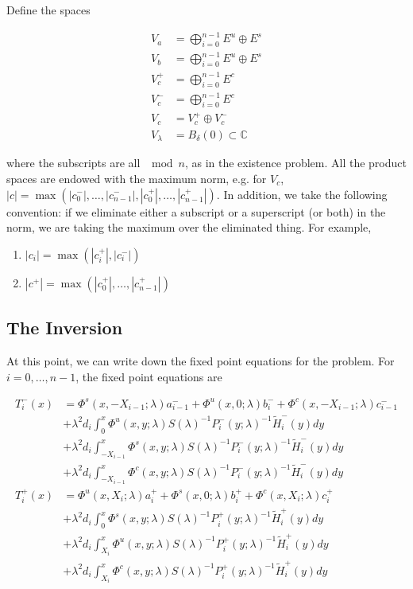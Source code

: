 \documentclass[12pt]{article}
\def\C{{\mathbb C}}
\begin{document}
Define the spaces

\begin{align*}
V_a &= \bigoplus_{i=0}^{n-1} E^u \oplus E^s \\
V_b &= \bigoplus_{i=0}^{n-1} E^u \oplus E^s \\
V_c^+ &= \bigoplus_{i=0}^{n-1} E^c \\
V_c^- &= \bigoplus_{i=0}^{n-1} E^c \\
V_c &= V_c^+ \oplus V_c^- \\
V_\lambda &= B_\delta(0) \subset \C
\end{align*}

where the subscripts are all $\mod n$, as in the existence problem. All the product spaces are endowed with the maximum norm, e.g. for $V_c$, $|c| = \max(|c_0^-|, \dots, |c_{n-1}^-|, |c_0^+|, \dots, |c_{n-1}^+|)$. In addition, we take the following convention: if we eliminate either a subscript or a superscript (or both) in the norm, we are taking the maximum over the eliminated thing. For example,
\begin{enumerate}
	\item $|c_i| = \max(|c_i^+|, |c_i^-|)$ 
	\item $|c^+| = \max(|c_0^+|, \dots, |c_{n-1}^+|)$
\end{enumerate}

\subsection*{The Inversion}

At this point, we can write down the fixed point equations for the problem. For $i = 0, \dots, n-1$, the fixed point equations are

\begin{align*}
T_i^-(x) &= \Phi^s(x, -X_{i-1}; \lambda) a_{i-1}^- + \Phi^u(x, 0; \lambda) b_i^- + \Phi^c(x, -X_{i-1}; \lambda) c_{i-1}^- \\
&+ \lambda^2 d_i \int_0^x \Phi^u(x, y; \lambda) S(\lambda)^{-1} P_i^-(y; \lambda)^{-1} \tilde{H}_i^-(y) dy \\
&+ \lambda^2 d_i \int_{-X_{i-1}}^x \Phi^s(x, y; \lambda) S(\lambda)^{-1} P_i^-(y; \lambda)^{-1} \tilde{H}_i^-(y) dy \\
&+ \lambda^2 d_i \int_{-X_{i-1}}^x \Phi^c(x, y; \lambda) S(\lambda)^{-1} P_i^-(y; \lambda)^{-1} \tilde{H}_i^-(y) dy  \\ 
T_i^+(x) &= \Phi^u(x, X_i; \lambda) a_i^+ + \Phi^s(x, 0; \lambda) b_i^+ + \Phi^c(x, X_i; \lambda) c_i^+ \\
&+ \lambda^2 d_i \int_0^x \Phi^s(x, y; \lambda) S(\lambda)^{-1} P_i^+(y; \lambda)^{-1} \tilde{H}_i^+(y) dy \\
&+ \lambda^2 d_i \int_{X_i}^x \Phi^u(x, y; \lambda) S(\lambda)^{-1} P_i^+(y; \lambda)^{-1} \tilde{H}_i^+(y) dy \\
&+ \lambda^2 d_i \int_{X_i}^x \Phi^c(x, y; \lambda) S(\lambda)^{-1} P_i^+(y; \lambda)^{-1} \tilde{H}_i^+(y) dy \\
\end{align*}
\end{document}
